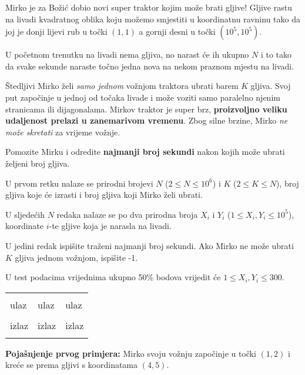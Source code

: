 \renewcommand{\taskname}{TRAKTOR}
\renewcommand{\timelimit}{2 sekunde}
\renewcommand{\memorylimit}{32 MB}
\renewcommand{\score}{100 bodova}

Mirko je za Božić dobio novi super traktor kojim može brati gljive! Gljive rastu na livadi kvadratnog oblika koju možemo smjestiti u koordinatnu ravninu tako da joj je donji lijevi rub u točki $(1, 1)$ a gornji desni u točki $(10^5, 10^5)$.

U početnom trenutku na livadi nema gljiva, no narast će ih ukupno $N$ i to tako da svake sekunde naraste točno jedna nova na nekom praznom mjestu na livadi. 

Štedljivi Mirko želi \emph{samo jednom} vožnjom traktora ubrati barem $K$ gljiva. Svoj put započinje u jednoj od točaka livade i može voziti samo paralelno njenim stranicama ili dijagonalama. 
Mirkov traktor je super brz, \textbf{proizvoljno veliku udaljenost prelazi u zanemarivom vremenu}. Zbog silne brzine, Mirko \emph{ne može skretati} za vrijeme vožnje.

Pomozite Mirku i odredite \textbf{najmanji broj sekundi} nakon kojih može ubrati željeni broj gljiva. 

\strut


U prvom retku nalaze se prirodni brojevi $N$ ($2 \leqslant N \leqslant 10^6$) i $K$ ($2 \leqslant K \leqslant N$), broj gljiva koje će izrasti i broj gljiva koji Mirko želi ubrati.

U sljedećih $N$ redaka nalaze se po dva prirodna broja $X_i$ i $Y_i$ ($1 \leqslant X_i, Y_i \leqslant 10^5$), koordinate $i$-te gljive koja je narasla na livadi.


U jedini redak ispišite traženi najmanji broj sekundi.
Ako Mirko ne može ubrati $K$ gljiva jednom vožnjom, ispišite -1.


U test podacima vrijednima ukupno 50\% bodova vrijedit će $1 \leqslant X_i, Y_i \leqslant 300$.

\strut


\begin{center}
\fontfamily{\ttdefault}
\fontsize{10pt}{1em}
\selectfont
\begin{tabu}to 0.99\textwidth{|X[1]|X[1]|X[1]|}
\hline
& & \\ 
\rowfont{\fontsize{10pt}{1em}\bfseries}
ulaz & ulaz & ulaz\\
 &
 & 
 \\
\rowfont{\fontsize{10pt}{1em}\bfseries}
izlaz & izlaz & izlaz\\
 &
 & 
 \\
\hline
\end{tabu}
\end{center}

{
\fontsize{10pt}{1em}
\selectfont
\textbf{Pojašnjenje prvog primjera:} Mirko svoju vožnju započinje u točki $(1, 2)$ i kreće se prema gljivi s koordinatama $(4, 5)$. \\
}